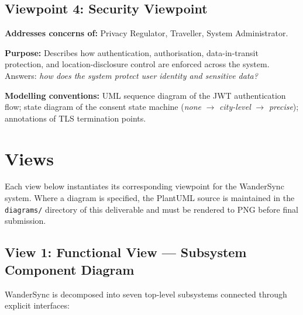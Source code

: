 \documentclass[12pt,a4paper]{article}
\begin{document}
\subsection{Viewpoint 4: Security Viewpoint}

\textbf{Addresses concerns of:} Privacy Regulator, Traveller, System Administrator.

\textbf{Purpose:} Describes how authentication, authorisation, data-in-transit protection, and
location-disclosure control are enforced across the system. Answers: \textit{how does the system
protect user identity and sensitive data?}

\textbf{Modelling conventions:} UML sequence diagram of the JWT authentication flow; state diagram
of the consent state machine (\textit{none} $\to$ \textit{city-level} $\to$ \textit{precise});
annotations of TLS termination points.

\section{Views}

Each view below instantiates its corresponding viewpoint for the WanderSync system. Where a
diagram is specified, the PlantUML source is maintained in the \texttt{diagrams/} directory of
this deliverable and must be rendered to PNG before final submission.

\subsection{View 1: Functional View — Subsystem Component Diagram}

WanderSync is decomposed into seven top-level subsystems connected through explicit interfaces:
\end{document}
